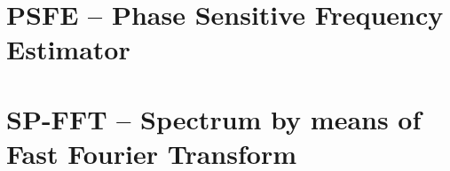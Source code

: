 \documentclass[12pt,a4paper,oneside]{report} %
\begin{document}
\chapter{PSFE -- Phase Sensitive Frequency Estimator} %
\section*{\infosection} %

\section*{\examplesection} %


\chapter{SP-FFT -- Spectrum by means of Fast Fourier Transform} %
\section*{\infosection} %

\section*{\examplesection} %

\end{document}
